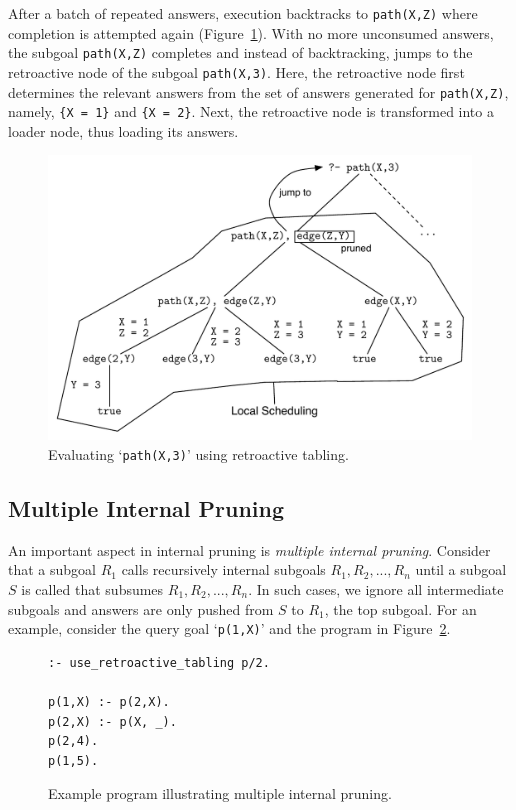 After a batch of repeated answers, execution backtracks to \texttt{path(X,Z)} where
completion is attempted again (Figure~\ref{fig:retro_path}). With no more unconsumed answers, the subgoal
\texttt{path(X,Z)} completes and instead of backtracking, jumps to the retroactive node of the subgoal
\texttt{path(X,3)}. Here, the retroactive node first determines the relevant answers from the set of
answers generated for \texttt{path(X,Z)}, namely, \texttt{\{X~=~1\}} and \texttt{\{X~=~2\}}. Next,
the retroactive node is transformed into a loader node, thus loading its answers.

\begin{figure}[ht]
  \centering
    \includegraphics[scale=0.7]{retro_path.pdf}
  \caption{Evaluating `\texttt{path(X,3)}' using retroactive tabling.}
  \label{fig:retro_path}
\end{figure}

\subsection{Multiple Internal Pruning}

An important aspect in internal pruning is \textit{multiple internal pruning}.
Consider that a subgoal $R_1$ calls recursively internal subgoals $R_1, R_2, ..., R_n$ until a subgoal
$S$ is called that subsumes $R_1, R_2, ..., R_n$. In such cases, we ignore all intermediate subgoals
and answers are only pushed from $S$ to $R_1$, the top subgoal. 
For an example, consider the query goal `\texttt{p(1,X)}' and the program in Figure~\ref{fig:retro_multiple_internal_program}.

\begin{figure}[ht]
\begin{Verbatim}
:- use_retroactive_tabling p/2.

p(1,X) :- p(2,X).
p(2,X) :- p(X, _).
p(2,4).
p(1,5).
\end{Verbatim}
\caption{Example program illustrating multiple internal pruning.}
\label{fig:retro_multiple_internal_program}
\end{figure}

